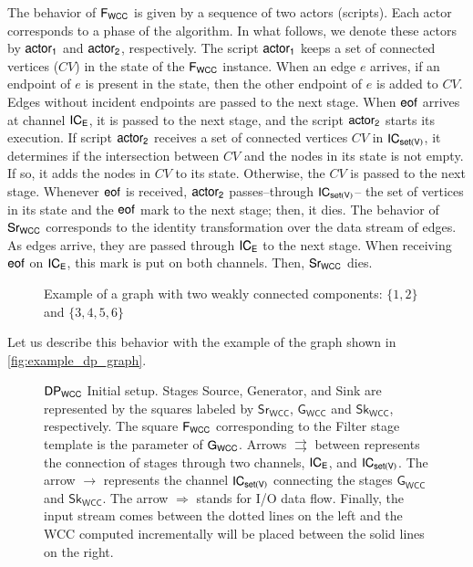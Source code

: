   The behavior of $\mathsf{F_{WCC}}$ is given by a sequence of two actors (scripts). Each actor corresponds to a phase of the algorithm. In what follows, we denote these actors by $\mathsf{actor_1}$ and $\mathsf{actor_2}$, respectively. 
  The script $\mathsf{actor_1}$ keeps a set of connected vertices ($CV$) in the state of the $\mathsf{F_{WCC}}$ instance. When an edge $e$ arrives, if an endpoint of $e$ is present in the state, then the other endpoint of $e$ is added to $CV$. 
  Edges without incident endpoints are passed to the next stage. When $\mathsf{eof}$ arrives at channel $\mathsf{IC_E}$, it is passed to the next stage, and the script $\mathsf{actor_2}$ starts its execution. 
  If script $\mathsf{actor_2}$ receives a set of connected vertices $CV$ in $\mathsf{IC_{set(V)}}$, it determines if the intersection between $CV$ and the nodes in its state is not empty. If so, it adds the nodes in $CV$  to its state. 
  Otherwise, the $CV$ is passed to the next stage.  Whenever $\mathsf{eof}$ is received, $\mathsf{actor_2}$ passes--through $\mathsf{IC_{set(V)}}$-- the set of vertices in its state and the $\mathsf{eof}$ mark to the next stage; then, it dies.
  The behavior of $\mathsf{Sr_{WCC}}$ corresponds to the identity transformation over the data stream of edges.  As edges arrive, they are passed through  $\mathsf{IC_E}$ to the next stage. When receiving $\mathsf{eof}$ on $\mathsf{IC_E}$, this mark is put on both channels. 
  Then, $\mathsf{Sr_{WCC}}$ dies. 
  
  \begin{figure}
   \begin{center}
  \end{center}
  \caption[{[PoC] Graph WCC Example}]{Example of a graph with two weakly connected components: $\{1,2\}$ and $\{3,4,5,6\}$}
  \label{fig:example_dp_graph}
  \end{figure}
  
  Let us describe this behavior with the example of the graph shown in \autoref{fig:example_dp_graph}.
  
  \begin{figure}[h!]
    \centering
  \caption[{[PoC] $\dpwcc$ Initial Setup}]{$\dpwcc$ Initial setup. Stages Source, Generator, and Sink are represented by the squares labeled by $\mathsf{Sr_{WCC}}$, $\mathsf{G_{WCC}}$ and $\mathsf{Sk_{WCC}}$, respectively.  The square $\mathsf{F_{WCC}}$ corresponding to the Filter stage template is the parameter of $\mathsf{G_{WCC}}$. Arrows $\rightrightarrows$ between represents the connection of stages through two channels, $\mathsf{IC_E}$, and $\mathsf{IC_{set(V)}}$. The arrow  $\rightarrow$ represents the channel $\mathsf{IC_{set(V)}}$ connecting the stages $\mathsf{G_{WCC}}$ and $\mathsf{Sk_{WCC}}$. The arrow $\Longrightarrow$ stands for I/O data flow. Finally, the input stream comes between the dotted lines on the left and the WCC computed incrementally will be placed between the solid lines on the right.}
  \label{fig:dp_example_0}
  \end{figure}
  
